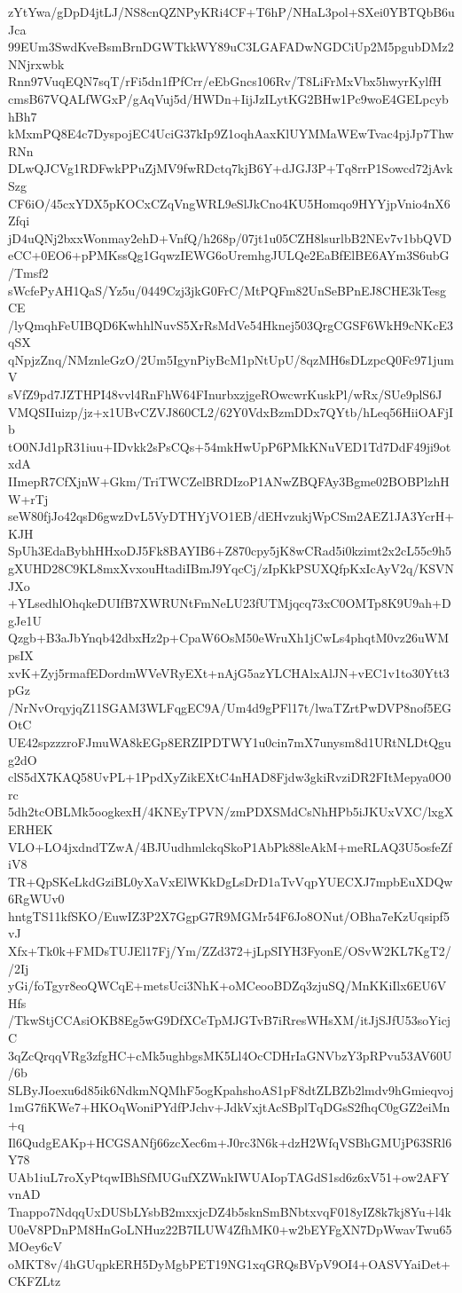 zYtYwa/gDpD4jtLJ/NS8cnQZNPyKRi4CF+T6hP/NHaL3pol+SXei0YBTQbB6uJca
99EUm3SwdKveBsmBrnDGWTkkWY89uC3LGAFADwNGDCiUp2M5pgubDMz2NNjrxwbk
Rnn97VuqEQN7sqT/rFi5dn1fPfCrr/eEbGncs106Rv/T8LiFrMxVbx5hwyrKylfH
cmsB67VQALfWGxP/gAqVuj5d/HWDn+IijJzILytKG2BHw1Pc9woE4GELpcybhBh7
kMxmPQ8E4c7DyspojEC4UciG37kIp9Z1oqhAaxKlUYMMaWEwTvac4pjJp7ThwRNn
DLwQJCVg1RDFwkPPuZjMV9fwRDctq7kjB6Y+dJGJ3P+Tq8rrP1Sowcd72jAvkSzg
CF6iO/45cxYDX5pKOCxCZqVngWRL9eSlJkCno4KU5Homqo9HYYjpVnio4nX6Zfqi
jD4uQNj2bxxWonmay2ehD+VnfQ/h268p/07jt1u05CZH8lsurlbB2NEv7v1bbQVD
eCC+0EO6+pPMKssQg1GqwzIEWG6oUremhgJULQe2EaBfElBE6AYm3S6ubG/Tmsf2
sWcfePyAH1QaS/Yz5u/0449Czj3jkG0FrC/MtPQFm82UnSeBPnEJ8CHE3kTesgCE
/lyQmqhFeUIBQD6KwhhlNuvS5XrRsMdVe54Hknej503QrgCGSF6WkH9cNKcE3qSX
qNpjzZnq/NMznleGzO/2Um5IgynPiyBcM1pNtUpU/8qzMH6sDLzpcQ0Fc971jumV
sVfZ9pd7JZTHPI48vvl4RnFhW64FInurbxzjgeROwcwrKuskPl/wRx/SUe9plS6J
VMQSIIuizp/jz+x1UBvCZVJ860CL2/62Y0VdxBzmDDx7QYtb/hLeq56HiiOAFjIb
tO0NJd1pR31iuu+IDvkk2sPsCQs+54mkHwUpP6PMkKNuVED1Td7DdF49ji9otxdA
IImepR7CfXjnW+Gkm/TriTWCZelBRDIzoP1ANwZBQFAy3Bgme02BOBPlzhHW+rTj
seW80fjJo42qsD6gwzDvL5VyDTHYjVO1EB/dEHvzukjWpCSm2AEZ1JA3YcrH+KJH
SpUh3EdaBybhHHxoDJ5Fk8BAYIB6+Z870cpy5jK8wCRad5i0kzimt2x2cL55c9h5
gXUHD28C9KL8mxXvxouHtadiIBmJ9YqcCj/zIpKkPSUXQfpKxIcAyV2q/KSVNJXo
+YLsedhlOhqkeDUIfB7XWRUNtFmNeLU23fUTMjqcq73xC0OMTp8K9U9ah+DgJe1U
Qzgb+B3aJbYnqb42dbxHz2p+CpaW6OsM50eWruXh1jCwLs4phqtM0vz26uWMpsIX
xvK+Zyj5rmafEDordmWVeVRyEXt+nAjG5azYLCHAlxAlJN+vEC1v1to30Ytt3pGz
/NrNvOrqyjqZ11SGAM3WLFqgEC9A/Um4d9gPFl17t/lwaTZrtPwDVP8nof5EGOtC
UE42spzzzroFJmuWA8kEGp8ERZIPDTWY1u0cin7mX7unysm8d1URtNLDtQgug2dO
clS5dX7KAQ58UvPL+1PpdXyZikEXtC4nHAD8Fjdw3gkiRvziDR2FItMepya0O0rc
5dh2tcOBLMk5oogkexH/4KNEyTPVN/zmPDXSMdCsNhHPb5iJKUxVXC/lxgXERHEK
VLO+LO4jxdndTZwA/4BJUudhmlckqSkoP1AbPk88leAkM+meRLAQ3U5osfeZfiV8
TR+QpSKeLkdGziBL0yXaVxElWKkDgLsDrD1aTvVqpYUECXJ7mpbEuXDQw6RgWUv0
hntgTS11kfSKO/EuwIZ3P2X7GgpG7R9MGMr54F6Jo8ONut/OBha7eKzUqsipf5vJ
Xfx+Tk0k+FMDsTUJEl17Fj/Ym/ZZd372+jLpSIYH3FyonE/OSvW2KL7KgT2//2Ij
yGi/foTgyr8eoQWCqE+metsUci3NhK+oMCeooBDZq3zjuSQ/MnKKiIlx6EU6VHfs
/TkwStjCCAsiOKB8Eg5wG9DfXCeTpMJGTvB7iRresWHsXM/itJjSJfU53soYicjC
3qZcQrqqVRg3zfgHC+cMk5ughbgsMK5Ll4OcCDHrIaGNVbzY3pRPvu53AV60U/6b
SLByJIoexu6d85ik6NdkmNQMhF5ogKpahshoAS1pF8dtZLBZb2lmdv9hGmieqvoj
1mG7fiKWe7+HKOqWoniPYdfPJchv+JdkVxjtAcSBplTqDGsS2fhqC0gGZ2eiMn+q
Il6QudgEAKp+HCGSANfj66zcXec6m+J0rc3N6k+dzH2WfqVSBhGMUjP63SRl6Y78
UAb1iuL7roXyPtqwIBhSfMUGufXZWnkIWUAIopTAGdS1sd6z6xV51+ow2AFYvnAD
Tnappo7NdqqUxDUSbLYsbB2mxxjcDZ4b5sknSmBNbtxvqF018yIZ8k7kj8Yu+l4k
U0eV8PDnPM8HnGoLNHuz22B7ILUW4ZfhMK0+w2bEYFgXN7DpWwavTwu65MOey6cV
oMKT8v/4hGUqpkERH5DyMgbPET19NG1xqGRQsBVpV9OI4+OASVYaiDet+CKFZLtz
